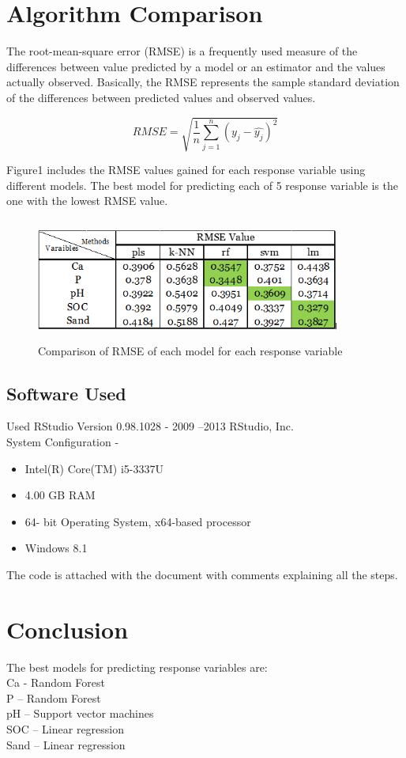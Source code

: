 \documentclass[12pt,letterpaper]{article}
\begin{document}
\section{Algorithm Comparison}
The root-mean-square error (RMSE) is a frequently used measure of the differences between value predicted by a model or an estimator and the values actually observed. Basically, the RMSE represents the sample standard deviation of the differences between predicted values and observed values.

$$RMSE = \sqrt{\frac{1}{n}
	\sum_{j=1}^{n}(y_j-\hat{y_j})^2}$$



Figure1 includes the RMSE values gained for each response variable using different models. The best model for predicting each of 5 response variable is the one with the lowest RMSE value.

\begin{figure}[h!]
	\centering
	\includegraphics[height= 4cm,width=10cm]{Table.png}
	\caption{\label{fig:Table} Comparison of RMSE of each model for each response variable}
\end{figure}

\subsection{Software Used}
Used RStudio Version 0.98.1028 - 2009 --2013 RStudio, Inc.\\

System Configuration - 
\begin{itemize}
	\item Intel(R) Core(TM) i5-3337U
	\item 4.00 GB RAM
	\item 64- bit Operating System, x64-based processor
	\item Windows 8.1
\end{itemize}

The code is attached with the document with comments explaining all the steps.
\newpage
\section{Conclusion}

The best models for predicting response variables are:\\

\noindent Ca  - Random Forest\\
P – Random Forest\\
pH – Support vector machines \\
SOC – Linear regression\\
Sand – Linear regression \\

\newpage


\end{document}

